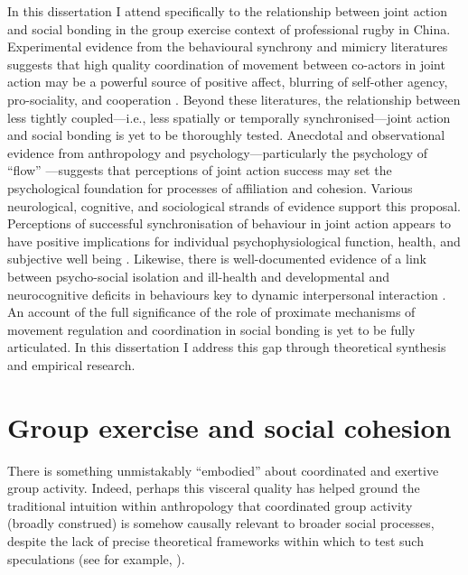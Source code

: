 In this dissertation I attend specifically to the relationship between joint action and social bonding in the group exercise context of professional rugby in China.  Experimental evidence from the behavioural synchrony and mimicry literatures suggests that high quality coordination of movement between co-actors in joint action may be a powerful source of positive affect, blurring of self-other agency, pro-sociality, and cooperation \citep{Mogan2017}.  Beyond these literatures, the relationship between less tightly coupled---i.e., less spatially or temporally synchronised---joint action and social bonding is yet to be thoroughly tested. Anecdotal and observational evidence from anthropology and psychology---particularly the psychology of ``flow'' \citep{Csikszentmihalyi1992,Jackson1999}---suggests that perceptions of joint action success may set the psychological foundation for processes of affiliation and cohesion.  Various neurological, cognitive, and sociological strands of evidence support this proposal.  Perceptions of successful synchronisation of behaviour in joint action appears to have positive implications for individual psychophysiological function, health, and subjective well being \citep{Wheatley2012}.  Likewise, there is well-documented evidence of a link between psycho-social isolation and ill-health and developmental and neurocognitive deficits in behaviours key to dynamic interpersonal interaction \citep[e.g.][]{Blakemore2005,Baron-Cohen1991}. An account of the full significance of the role of proximate mechanisms of movement regulation and coordination in social bonding is yet to be fully articulated. In this dissertation I address this gap through theoretical synthesis and empirical research.




\section{Group exercise and social cohesion}
There is something unmistakably ``embodied'' about coordinated and exertive group activity.
Indeed, perhaps this visceral quality has helped ground the traditional intuition within anthropology that coordinated group activity (broadly construed) is somehow causally relevant to broader social processes, despite the lack of precise theoretical frameworks within which to test such speculations (see for example, \citep{Durkheim1965,Mauss1935,Radcliffe-Brown1952,Turner1974,Merleau-Ponty1956,Bourdieu1990}).

